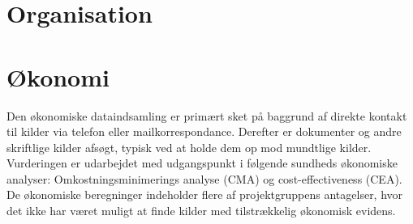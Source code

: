 \section{Organisation}
\section{Økonomi}
Den økonomiske dataindsamling er primært sket på baggrund af direkte kontakt til kilder via telefon eller mailkorrespondance. Derefter er dokumenter og andre skriftlige kilder afsøgt, typisk ved at holde dem op mod mundtlige kilder. Vurderingen er udarbejdet med udgangspunkt i følgende sundheds økonomiske analyser: Omkostningsminimerings analyse (CMA) og cost-effectiveness (CEA). De økonomiske beregninger indeholder flere af projektgruppens antagelser, hvor det ikke har været muligt at finde kilder med tilstrækkelig økonomisk evidens. 